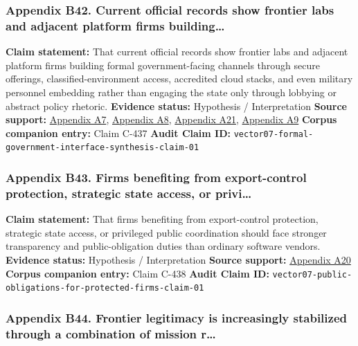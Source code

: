 \documentclass[
  american,
  11pt,
  letterpaper,
]{article}
\begin{document}
\subsubsection{Appendix B42. Current official records show frontier labs
and adjacent platform firms
building\ldots{}}\label{ch-10-appendix-b42-current-official-records-show-frontier-labs-and-adjacent-platform-firms-building}

\textbf{Claim statement:} That current official records show frontier
labs and adjacent platform firms building formal government-facing
channels through secure offerings, classified-environment access,
accredited cloud stacks, and even military personnel embedding rather
than engaging the state only through lobbying or abstract policy
rhetoric. \textbf{Evidence status:} Hypothesis / Interpretation
\textbf{Source support:}
\hyperref[ch-10-appendix-a7-introducing-openai-for-government]{Appendix
A7},
\hyperref[ch-10-appendix-a8-claude-gov-models-for-u-s-national-security-customers]{Appendix
A8},
\hyperref[ch-10-appendix-a21-anthropic-and-palantir-partner-to-bring-claude-ai-models-to-aws-for-u-s-government-intelligence-and-defense-operations]{Appendix
A21},
\hyperref[ch-10-appendix-a9-army-launches-detachment-201-executive-innovation-corps-to-drive-tech-transformation]{Appendix
A9} \textbf{Corpus companion entry:} Claim C-437 \textbf{Audit Claim
ID:} \texttt{vector07-formal-government-interface-synthesis-claim-01}

\subsubsection{Appendix B43. Firms benefiting from export-control
protection, strategic state access, or
privi\ldots{}}\label{ch-10-appendix-b43-firms-benefiting-from-export-control-protection-strategic-state-access-or-privi}

\textbf{Claim statement:} That firms benefiting from export-control
protection, strategic state access, or privileged public coordination
should face stronger transparency and public-obligation duties than
ordinary software vendors. \textbf{Evidence status:} Hypothesis /
Interpretation \textbf{Source support:}
\hyperref[ch-10-appendix-a20-openais-proposals-for-the-us-ai-action-plan]{Appendix
A20} \textbf{Corpus companion entry:} Claim C-438 \textbf{Audit Claim
ID:} \texttt{vector07-public-obligations-for-protected-firms-claim-01}

\subsubsection{Appendix B44. Frontier legitimacy is increasingly
stabilized through a combination of mission
r\ldots{}}\label{ch-10-appendix-b44-frontier-legitimacy-is-increasingly-stabilized-through-a-combination-of-mission-r}
\end{document}
